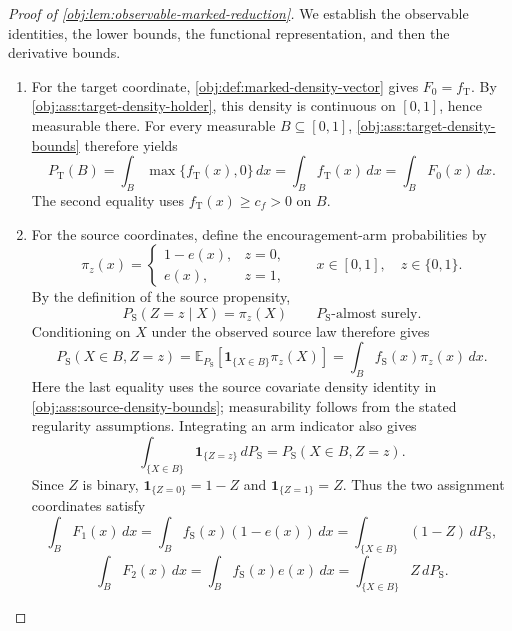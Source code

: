 \begin{proof}[Proof of \cref{obj:lem:observable-marked-reduction}]
We establish the observable identities, the lower bounds, the functional representation, and then the derivative bounds.

\begin{enumerate}
\item For the target coordinate, \cref{obj:def:marked-density-vector} gives \(F_0=f_{\mathrm T}\). By \cref{obj:ass:target-density-holder}, this density is continuous on \([0,1]\), hence measurable there. For every measurable \(B\subseteq[0,1]\), \cref{obj:ass:target-density-bounds} therefore yields
\[
P_{\mathrm T}(B)
=\int_B\max\{f_{\mathrm T}(x),0\}\,dx
=\int_B f_{\mathrm T}(x)\,dx
=\int_B F_0(x)\,dx.
\]
The second equality uses \(f_{\mathrm T}(x)\ge c_f>0\) on \(B\).

\item For the source coordinates, define the encouragement-arm probabilities by
\[
\pi_z(x)=
\begin{cases}
1-e(x),&z=0,\\
e(x),&z=1,
\end{cases}
\qquad x\in[0,1],\quad z\in\{0,1\}.
\]
By the definition of the source propensity,
\[
P_{\mathrm S}(Z=z\mid X)=\pi_z(X)
\qquad P_{\mathrm S}\text{-almost surely}.
\]
Conditioning on \(X\) under the observed source law therefore gives
\[
P_{\mathrm S}(X\in B,Z=z)
=
\mathbb E_{P_{\mathrm S}}\!\left[
\mathbf 1_{\{X\in B\}}\pi_z(X)
\right]
=
\int_B f_{\mathrm S}(x)\pi_z(x)\,dx.
\]
Here the last equality uses the source covariate density identity in
\cref{obj:ass:source-density-bounds}; measurability follows from the stated regularity assumptions. Integrating an arm indicator also gives
\[
\int_{\{X\in B\}}\mathbf 1_{\{Z=z\}}\,dP_{\mathrm S}
=P_{\mathrm S}(X\in B,Z=z).
\]
Since \(Z\) is binary, \(\mathbf 1_{\{Z=0\}}=1-Z\) and
\(\mathbf 1_{\{Z=1\}}=Z\). Thus the two assignment coordinates satisfy
\[
\int_B F_1(x)\,dx
=\int_B f_{\mathrm S}(x)(1-e(x))\,dx
=\int_{\{X\in B\}}(1-Z)\,dP_{\mathrm S},
\]
\[
\int_B F_2(x)\,dx
=\int_B f_{\mathrm S}(x)e(x)\,dx
=\int_{\{X\in B\}}Z\,dP_{\mathrm S}.
\]


\end{enumerate}
\end{proof}
